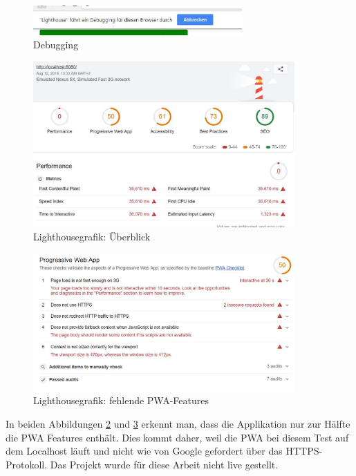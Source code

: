 \begin{figure}[h]
	\centering
	\includegraphics[width=8cm]{BilderAllgemein/Test/debuggingLighthouse}\medskip
	\caption{Debugging}
	\label{fig:LighthouseDebugging}
\end{figure}
 

\begin{figure}[H]
	\centering
	\includegraphics[width=10cm]{BilderAllgemein/Test/LightH_beforHTTPS_Overview}\medskip
	\caption{Lighthousegrafik: Überblick}
	\label{fig:LightH_beforHTTPS_Overview}
\end{figure}

\begin{figure}[h]
	\centering
	\includegraphics[width=10cm]{BilderAllgemein/Test/PWA_Test_Lighthouse_noHTTPS}\medskip
	\caption{Lighthousegrafik: fehlende PWA-Features}
	\label{fig:PWA_Test_Lighthouse_noHTTPS}
\end{figure}

In beiden Abbildungen \ref{fig:LightH_beforHTTPS_Overview} und \ref{fig:PWA_Test_Lighthouse_noHTTPS} erkennt man, dass die Applikation nur zur Hälfte die PWA Features enthält.
Dies kommt daher, weil die \acs{PWA} bei diesem Test auf dem Localhost läuft und nicht wie von Google gefordert über das HTTPS-Protokoll.
Das Projekt wurde für diese Arbeit nicht live gestellt.


